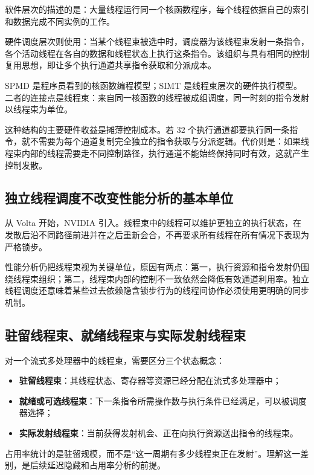 软件层次的描述的是：大量线程运行同一个核函数程序，每个线程依据自己的索引和数据完成不同实例的工作。

硬件调度层次则使用：当某个线程束被选中时，调度器为该线程束发射一条指令，各个活动线程在各自的数据和线程状态上执行这条指令。该组织与具有相同的控制复用思想，即让多个执行通道共享指令获取和分派成本。

\begin{keybox}
SPMD 是程序员看到的核函数编程模型；SIMT 是线程束层次的硬件执行模型。二者的连接点是线程束：来自同一核函数的线程被成组调度，同一时刻的指令发射以线程束为单位。
\end{keybox}

这种结构的主要硬件收益是摊薄控制成本。若 32 个执行通道都要执行同一条指令，就不需要为每个通道复制完全独立的指令获取与分派逻辑。代价则是：如果线程束内部的线程需要走不同控制路径，执行通道不能始终保持同时有效，这就产生控制发散。

\subsection{独立线程调度不改变性能分析的基本单位}

从 Volta 开始，NVIDIA 引入。线程束中的线程可以维护更独立的执行状态，在发散后沿不同路径前进并在之后重新会合，不再要求所有线程在所有情况下表现为严格锁步。

性能分析仍把线程束视为关键单位，原因有两点：第一，执行资源和指令发射仍围绕线程束组织；第二，线程束内部的控制不一致依然会降低有效通道利用率。独立线程调度还意味着某些过去依赖隐含锁步行为的线程间协作必须使用更明确的同步机制。

\subsection{驻留线程束、就绪线程束与实际发射线程束}

对一个流式多处理器中的线程束，需要区分三个状态概念：

\begin{itemize}
  \item \textbf{驻留线程束}：其线程状态、寄存器等资源已经分配在流式多处理器中；
  \item \textbf{就绪或可选线程束}：下一条指令所需操作数与执行条件已经满足，可以被调度器选择；
  \item \textbf{实际发射线程束}：当前获得发射机会、正在向执行资源送出指令的线程束。
\end{itemize}

占用率统计的是驻留规模，而不是“这一周期有多少线程束正在发射”。理解这一差别，是后续延迟隐藏和占用率分析的前提。
